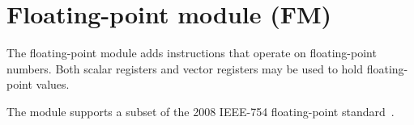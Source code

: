 %

\chapter{Floating-point module (FM)}
\label{module:FM}

The floating-point module adds instructions that operate on floating-point
numbers. Both scalar registers and vector registers may be used to hold
floating-point values.

The module supports a subset of the 2008 IEEE-754 floating-point
standard~\cite{ieee754-2008}.

\tbd
